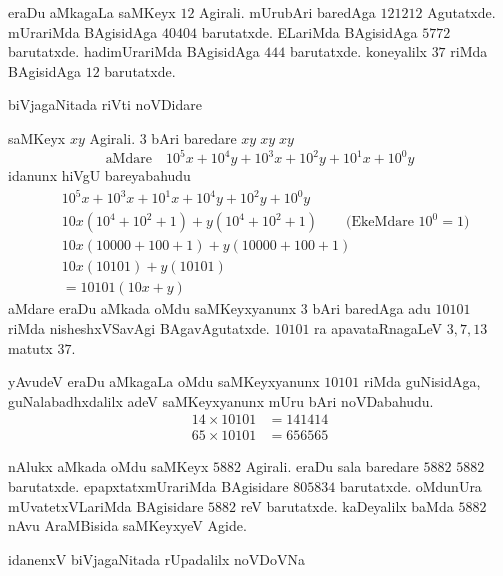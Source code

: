 
eraDu aMkagaLa saMKeyx $12$ Agirali. mUrubAri baredAga $121212$ Agutatxde. mUrariMda BAgisidAga $40404$ barutatxde. ELariMda BAgisidAga $5772$ barutatxde. hadimUrariMda BAgisidAga $444$ barutatxde. koneyalilx $37$ riMda BAgisidAga $12$ barutatxde.

biVjagaNitada riVti noVDidare

saMKeyx $xy$ Agirali. $3$ bAri baredare $xy\;xy\;xy$
$$
\text{aMdare}\quad 10^{5}x+10^{4}y+10^{3}x+10^{2}y+10^{1}x+10^{0}y 
$$
idanunx hiVgU bareyabahudu
\begin{align*}
&10^{5}x+10^{3}x+10^{1}x +10^{4}y+10^{2}y+10^{0}y\\
&10x\left(10^4 +10^2+1\right) +y\left(10^4+10^2+1\right)\qquad \text{(EkeMdare $10^0 = 1$)}\\
&10x(10000+100+1) + y (10000+100+1)\\
&10x(10101) + y(10101)\\
&=10101 (10x+y)
\end{align*}
aMdare eraDu aMkada oMdu saMKeyxyanunx $3$ bAri baredAga adu $10101$ riMda nisheshxVSavAgi BAgavAgutatxde. $10101$ ra apavataRnagaLeV $3,7,13$ matutx $37$.

yAvudeV eraDu aMkagaLa oMdu saMKeyxyanunx $10101$ riMda guNisidAga, guNa\-labadhxdalilx adeV saMKeyxyanunx mUru bAri noVDabahudu.
\begin{align*}
14\times 10101 &= 141414\\
65\times 10101 &= 656565
 \end{align*} 


nAlukx aMkada oMdu saMKeyx $5882$ Agirali. eraDu sala baredare $5882$ $5882$ barutatxde. epapxtatxmUrariMda BAgisidare $805834$ barutatxde. oMdunUra mUvatetxVLariMda BAgisidare $5882$ reV barutatxde. kaDeyalilx baMda $5882$ nAvu AraMBisida saMKeyxyeV Agide.

idanenxV biVjagaNitada rUpadalilx noVDoVNa

